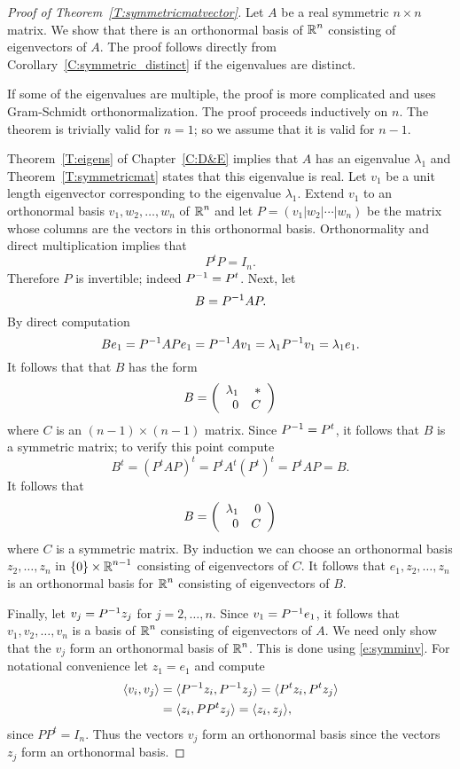 \documentclass{ximera}
\begin{document}
\begin{proof}[Proof of Theorem~\ref{T:symmetricmatvector}]
Let $A$ be a real symmetric $n\times n$ matrix.  We show that there is an 
orthonormal basis of $\mbox{$\Bbb{R}$}^n$ consisting of eigenvectors of $A$.  The proof
follows directly from Corollary~\ref{C:symmetric_distinct} if the  
eigenvalues are distinct.  

If some of the eigenvalues are multiple, the proof is more complicated and 
uses Gram-Schmidt orthonormalization.  The proof proceeds inductively on 
$n$.   The theorem is trivially valid for $n=1$; so we assume that it is valid 
for $n-1$.

Theorem~\ref{T:eigens} of Chapter~\ref{C:D&E} implies that $A$ has an 
eigenvalue $\lambda_1$ and Theorem~\ref{T:symmetricmat} states that 
this eigenvalue is real.
Let $v_1$ be a unit length eigenvector corresponding to the eigenvalue
$\lambda_1$.  Extend $v_1$ to an orthonormal basis $v_1,w_2,\ldots,w_n$ of
$\mbox{$\Bbb{R}$}^n$ and let $P=(v_1|w_2|\cdots|w_n)$ be the matrix whose columns are the
vectors in this orthonormal basis.  Orthonormality and direct multiplication
implies that
\begin{equation}  \label{e:orthosym}
P^tP=I_n.
\end{equation}
Therefore $P$ is invertible; indeed $P^{-1}=P^t$.
Next, let
\[
B= P^{-1} AP.
\]
By direct computation
\[
Be_1 = P^{-1} APe_1 = P^{-1} Av_1 = \lambda_1 P^{-1} v_1=\lambda_1e_1.
\]
It follows that that $B$ has the form
\[
B = \left(\begin{array}{rr} \lambda_1 & *\\ 0 &C\end{array}\right)
\]
where $C$ is an $(n-1)\times (n-1)$ matrix.   Since $P^{-1}=P^t$, it follows
that $B$ is a symmetric matrix; to verify this point compute
\[
B^t = (P^t AP)^t = P^t A^t (P^t)^t = P^tAP = B.
\]
It follows that
\[
B =\left(\begin{array}{rr} \lambda_1 & 0\\ 0 &C\end{array}\right)
\]
where $C$ is a symmetric matrix.  By induction we can choose an orthonormal
basis $z_2,\ldots,z_n$ in $\{0\}\times\mbox{$\Bbb{R}$}^{n-1}$ consisting of eigenvectors
of $C$.  It follows that $e_1,z_2,\ldots,z_n$ is an orthonormal basis for
$\mbox{$\Bbb{R}$}^n$ consisting of eigenvectors of $B$.

Finally, let $v_j=P^{-1} z_j$ for $j=2,\ldots,n$.  Since $v_1=P^{-1} e_1$,
it follows that  $v_1,v_2,\ldots,v_n$ is a basis of $\mbox{$\Bbb{R}$}^n$ consisting of
eigenvectors of $A$.  We need only show that the $v_j$ form an orthonormal
basis of $\mbox{$\Bbb{R}$}^n$.   This is done using \eqref{e:symminv}.  For notational
convenience let $z_1=e_1$ and compute
\begin{align*}
\langle v_i,v_j \rangle  &=\langle P^{-1} z_i,P^{-1} z_j\rangle =
                           \langle P^tz_i, P^tz_j \rangle \\
  &= \langle z_i, PP^t z_j \rangle =
\langle z_i,z_j \rangle,
\end{align*}
since $PP^t= I_n$.  Thus the vectors $v_j$ form an orthonormal basis since
the vectors $z_j$ form an orthonormal basis.  \end{proof}
\end{document}
